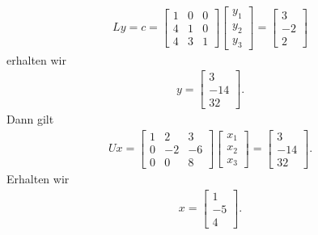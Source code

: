 \documentclass[fleqn,draft,a5paper]{article}
\theoremstyle{remark}
\begin{document}
  \begin{align*}
    Ly = c =
    \begin{bmatrix}
      1 & 0 & 0 \\ 4&1&0 \\ 4&3&1
    \end{bmatrix}
    \begin{bmatrix}
      y_{1} \\ y_{2} \\ y_{3}
    \end{bmatrix}
    =
    \begin{bmatrix}
      3 \\ -2 \\ 2
    \end{bmatrix}
  \end{align*}
  erhalten wir
  \begin{align*}
    y =
    \begin{bmatrix}
      3 \\ -14 \\ 32
    \end{bmatrix}.
  \end{align*}
  Dann gilt
  \begin{align*}
    Ux =
    \begin{bmatrix}
      1&2&3\\0&-2&-6\\0&0&8
    \end{bmatrix}
    \begin{bmatrix}
      x_{1} \\ x_{2} \\ x_{3}
    \end{bmatrix}
    =
    \begin{bmatrix}
      3 \\ -14 \\ 32
    \end{bmatrix}.
  \end{align*}
  Erhalten wir
  \begin{align*}
    x =
    \begin{bmatrix}
      1 \\ -5 \\ 4
    \end{bmatrix}.
  \end{align*}
\end{document}
